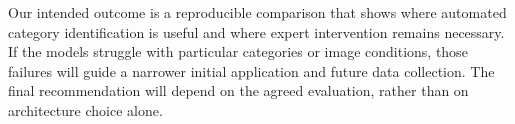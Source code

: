\documentclass[11pt,letterpaper]{article}
\begin{document}
Our intended outcome is a reproducible comparison that shows where automated category identification is useful and where expert intervention remains necessary. If the models struggle with particular categories or image conditions, those failures will guide a narrower initial application and future data collection. The final recommendation will depend on the agreed evaluation, rather than on architecture choice alone.

\clearpage
{}
{}


\end{document}
